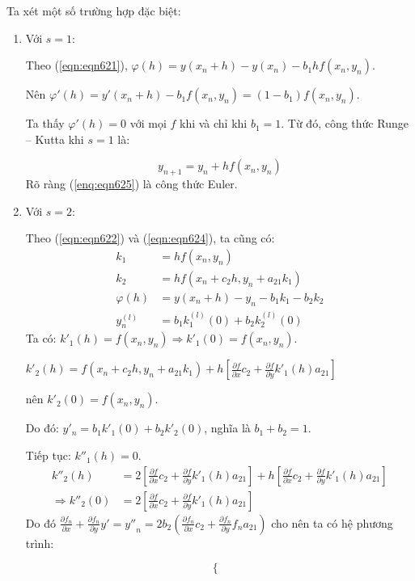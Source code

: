 Ta xét một số trường hợp đặc biệt:
\begin{enumerate}[label=\alph*)]
	\item Với $s=1$:\par
		Theo (\ref{eqn:eqn621}), $\varphi(h)=y(x_n+h)-y(x_n)-b_1hf(x_n,y_n)$.\par
		Nên $\varphi' (h)= y'(x_n+h)-b_1f(x_n,y_n)=(1-b_1)f(x_n,y_n)$.\par
		Ta thấy $\varphi'(h)=0 $ với mọi $f$ khi và chỉ khi $b_1=1$. Từ đó, công thức Runge – Kutta khi $s=1$ là:\par
		\begin{equation}\label{enq:eqn625}
			y_{n+1} = y_n + hf(x_n,y_n)
		\end{equation}
		Rõ ràng (\ref{enq:eqn625}) là công thức Euler.
	\item Với $s=2$:\par
		Theo (\ref{eqn:eqn622}) và (\ref{eqn:eqn624}), ta cũng có:
		\begin{align*}
			k_1 &= hf(x_n,y_n)\\
			k_2 &= hf(x_n+c_2 h,y_n+a_{21} k_1)\\
			\varphi(h) &= y(x_n+h)-y_n-b_1 k_1-b_2 k_2\\
			y_n^{(l)} &= b_1 k_1^{(l)}(0)+b_2 k_2^{(l)}(0)
		\end{align*}
		Ta có: $k'_1(h)= f(x_n,y_n)\Rightarrow k'_1 (0)=f(x_n,y_n)$.\par
		$k'_2(h)=f(x_n+c_2 h,y_n+a_{21} k_1)+h\left[\frac{\partial f}{\partial x}c_2+\frac{\partial f}{\partial y}k'_1(h)a_{21}\right]$\par
		nên $k'_2(0)=f(x_n,y_n)$.\par
		Do đó: $y'_n=b_1 k'_1(0)+b_2k'_2(0)$, nghĩa là $b_1+b_2=1$.\par
		Tiếp tục: $k''_1(h)=0.$
		\begin{align*}
			{k''}_2(h)&=2\left[\frac{\partial f}{\partial x}c_2+\frac{\partial f}{\partial y}{k'}_1(h)a_{21}\right]+h\left[\frac{\partial f}{\partial x}c_2+\frac{\partial f}{\partial y}{k'}_1(h)a_{21} \right]\\
			\Rightarrow {k''}_2(0)&=2\left[\frac{\partial f}{\partial x}c_2 +\frac{\partial f}{\partial y}{k'}_1(h)a_{21}\right]
		\end{align*}
		Do đó $\frac{\partial f_n}{\partial x}+\frac{\partial f_n}{\partial y}y'={y''}_n=2b_2\left(\frac{\partial f_n}{\partial x}c_2+\frac{\partial f_n}{\partial y}f_n a_{21}\right)$ cho nên ta có hệ phương trình:\par
		$$\begin{cases}

\end{cases}$$
\end{enumerate}
